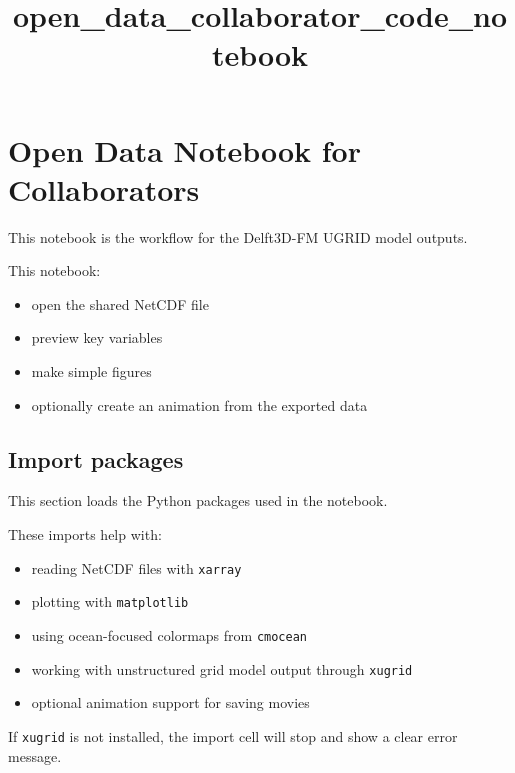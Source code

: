 \documentclass[11pt]{article}
\title{open\_data\_collaborator\_code\_notebook}
\providecommand{\tightlist}{%
      \setlength{\itemsep}{0pt}\setlength{\parskip}{0pt}}
\begin{document}
    
    \maketitle
    
    

    
    \section{Open Data Notebook for Collaborators}\label{open-data-notebook-for-collaborators}

This notebook is the workflow for the Delft3D-FM UGRID model outputs.

This notebook:

\begin{itemize}
\tightlist
\item
  open the shared NetCDF file
\item
  preview key variables
\item
  make simple figures
\item
  optionally create an animation from the exported data
\end{itemize}

    \subsection{Import packages}\label{import-packages}

This section loads the Python packages used in the notebook.

These imports help with:

\begin{itemize}
\tightlist
\item
  reading NetCDF files with \texttt{xarray}
\item
  plotting with \texttt{matplotlib}
\item
  using ocean-focused colormaps from \texttt{cmocean}
\item
  working with unstructured grid model output through \texttt{xugrid}
\item
  optional animation support for saving movies
\end{itemize}

If \texttt{xugrid} is not installed, the import cell will stop and show
a clear error message.
\end{document}

